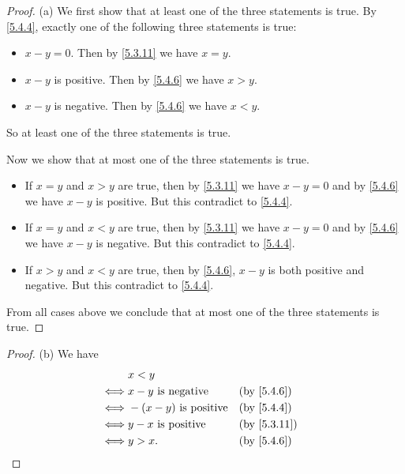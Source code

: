 \begin{proof}{(a)}
  We first show that at least one of the three statements is true.
  By \cref{5.4.4}, exactly one of the following three statements is true:
  \begin{itemize}
    \item \(x - y = 0\).
          Then by \cref{5.3.11} we have \(x = y\).
    \item \(x - y\) is positive.
          Then by \cref{5.4.6} we have \(x > y\).
    \item \(x - y\) is negative.
          Then by \cref{5.4.6} we have \(x < y\).
  \end{itemize}
  So at least one of the three statements is true.

  Now we show that at most one of the three statements is true.
  \begin{itemize}
    \item If \(x = y\) and \(x > y\) are true, then by \cref{5.3.11} we have \(x - y = 0\) and by \cref{5.4.6} we have \(x - y\) is positive.
          But this contradict to \cref{5.4.4}.
    \item If \(x = y\) and \(x < y\) are true, then by \cref{5.3.11} we have \(x - y = 0\) and by \cref{5.4.6} we have \(x - y\) is negative.
          But this contradict to \cref{5.4.4}.
    \item If \(x > y\) and \(x < y\) are true, then by \cref{5.4.6}, \(x - y\) is both positive and negative.
          But this contradict to \cref{5.4.4}.
  \end{itemize}
  From all cases above we conclude that at most one of the three statements is true.
\end{proof}

\begin{proof}{(b)}
  We have
  \begin{align*}
         & x < y                                         \\
    \iff & x - y \text{ is negative}    &  & \by{5.4.6}  \\
    \iff & -(x - y) \text{ is positive} &  & \by{5.4.4}  \\
    \iff & y - x \text{ is positive}    &  & \by{5.3.11} \\
    \iff & y > x.                       &  & \by{5.4.6}
  \end{align*}
\end{proof}

